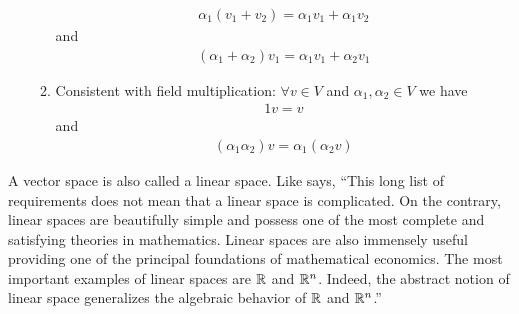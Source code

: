 \begin{definition}
\begin{enumerate}
\begin{enumerate}
\begin{align*}
        \alpha_1 (v_1 + v_2) = \alpha_1 v_1 + \alpha_1 v_2 
      \end{align*}
      and 
      \begin{align*}
        (\alpha_1 + \alpha_2)v_1 = \alpha_1 v_1 + \alpha_2 v_1
      \end{align*}
    \item Consistent with field multiplication: $\forall v \in V$ and
      $\alpha_1, \alpha_2 \in V$ we have
      \begin{align*}
        1 v = v
      \end{align*}
      and 
      \begin{align*}
        (\alpha_1 \alpha_2) v =\alpha_1 (\alpha_2 v)
      \end{align*}
    \end{enumerate}
  \end{enumerate}
\end{definition}
A vector space is also called a linear space. Like \citet{carter2001}
says, ``This long list of requirements does not mean that a linear
space is complicated. On the contrary, linear spaces are beautifully
simple and possess one of the most complete and satisfying theories in
mathematics.  Linear spaces are also immensely useful providing one of
the principal foundations of mathematical economics. The most
important examples of linear spaces are $\mathbb{R}$ and $\mathbb{R}^n$. Indeed, the
abstract notion of linear space generalizes the algebraic behavior of
$\mathbb{R}$ and $\mathbb{R}^n$.''


